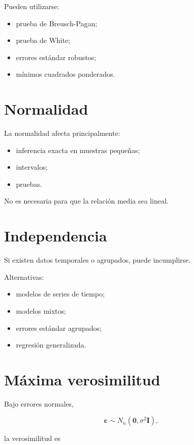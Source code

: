 \documentclass[
  spanish,
  11pt,
  letterpaper,
  DIV=11,
  numbers=noendperiod]{scrreprt}
\providecommand{\tightlist}{%
  \setlength{\itemsep}{0pt}\setlength{\parskip}{0pt}}
\theoremstyle{definition}
\theoremstyle{plain}
\theoremstyle{definition}
\theoremstyle{remark}
\begin{document}
Pueden utilizarse:

\begin{itemize}
\tightlist
\item
  prueba de Breusch-Pagan;
\item
  prueba de White;
\item
  errores estándar robustos;
\item
  mínimos cuadrados ponderados.
\end{itemize}

\section{Normalidad}\label{normalidad-1}

La normalidad afecta principalmente:

\begin{itemize}
\tightlist
\item
  inferencia exacta en muestras pequeñas;
\item
  intervalos;
\item
  pruebas.
\end{itemize}

No es necesaria para que la relación media sea lineal.

\section{Independencia}\label{independencia-2}

Si existen datos temporales o agrupados, puede incumplirse.

Alternativas:

\begin{itemize}
\tightlist
\item
  modelos de series de tiempo;
\item
  modelos mixtos;
\item
  errores estándar agrupados;
\item
  regresión generalizada.
\end{itemize}

\section{Máxima verosimilitud}\label{muxe1xima-verosimilitud}

Bajo errores normales,

\[
\boldsymbol{\varepsilon}
\sim
N_n(\mathbf{0},\sigma^2\mathbf{I}),
\]

la verosimilitud es
\end{document}

